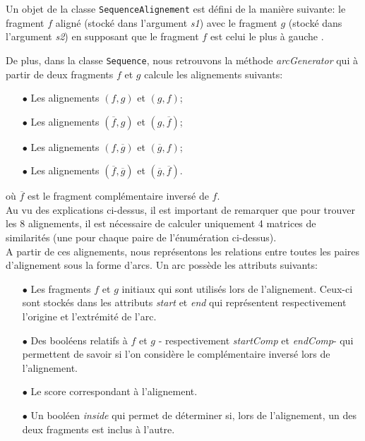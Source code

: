 Un objet de la classe \verb|SequenceAlignement| est défini de la manière
suivante: le fragment $f$ aligné (stocké dans l'argument \emph{s1}) avec le fragment $g$ (stocké dans l'argument \emph{s2}) en supposant que le
fragment $f$ est celui le plus à \og gauche \fg.

De plus,  dans la classe \verb|Sequence|, nous retrouvons la méthode \emph{arcGenerator} qui à partir de deux fragments $f$ et $g$ calcule les alignements suivants:\\
\begin{itemize}
	\item[$\bullet$] Les alignements $(f,g)$ et $(g,f)$;
	\item[$\bullet$] Les alignements $(\overline{f},g)$ et $(g, \overline{f})$;
	\item[$\bullet$] Les alignements $(f, \overline{g})$ et $(\overline{g},f)$;
	\item[$\bullet$] Les alignements  $(\overline{f}, \overline{g})$ et $(\overline{g}, \overline{f})$.
\end{itemize}
où $\overline{f}$ est le fragment complémentaire inversé de $f$.\\
Au vu des explications ci-dessus, il est important de remarquer que pour trouver les 8 alignements, il est nécessaire de calculer uniquement 4 matrices de similarités (une pour chaque paire de l'énumération ci-dessus).\\

A partir de ces alignements, nous représentons les relations entre toutes les paires d'alignement sous la forme d'arcs. Un arc possède les attributs suivants:\\

\begin{itemize}
	\item[$\bullet$] Les fragments $f$ et $g$ initiaux qui sont utilisés lors de l'alignement. Ceux-ci sont stockés dans les attributs \emph{start} et \emph{end} qui représentent respectivement l'origine et l'extrémité de l'arc.
	\item[$\bullet$] Des booléens relatifs à $f$ et $g$ - respectivement
		\emph{startComp} et \emph{endComp}- qui permettent de savoir si l'on considère le complémentaire inversé lors de l'alignement.
	\item[$\bullet$] Le score correspondant à l'alignement.
	\item[$\bullet$] Un booléen \emph{inside} qui permet de déterminer si, lors de l'alignement, un des deux fragments est inclus à l'autre.

\end{itemize}

